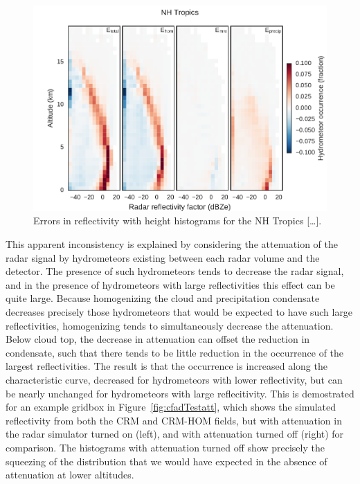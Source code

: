 \begin{figure}[htbp]
\centering
\includegraphics{graphics/subgrid1_cfadDbze94_NHTropics_diff.pdf}
\caption{\label{fig:cfadTropicsMroDiff}Errors in reflectivity with
height histograms for the NH Tropics
{[}\ldots{}{]}.}\label{fig:cfadTropicsMroDiff}
\end{figure}

This apparent inconsistency is explained by considering the attenuation
of the radar signal by hydrometeors existing between each radar volume
and the detector. The presence of such hydrometeors tends to decrease
the radar signal, and in the presence of hydrometeors with large
reflectivities this effect can be quite large. Because homogenizing the
cloud and precipitation condensate decreases precisely those
hydrometeors that would be expected to have such large reflectivities,
homogenizing tends to simultaneously decrease the attenuation. Below
cloud top, the decrease in attenuation can offset the reduction in
condensate, such that there tends to be little reduction in the
occurrence of the largest reflectivities. The result is that the
occurrence is increased along the characteristic curve, decreased for
hydrometeors with lower reflectivity, but can be nearly unchanged for
hydrometeors with large reflecitivity. This is demostrated for an
example gridbox in Figure~\ref{fig:cfadTestatt}, which shows the
simulated reflectivity from both the CRM and CRM-HOM fields, but with
attenuation in the radar simulator turned on (left), and with
attenuation turned off (right) for comparison. The histograms with
attenuation turned off show precisely the squeezing of the distribution
that we would have expected in the absence of attenuation at lower
altitudes.

